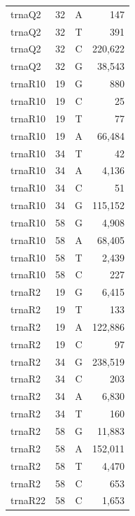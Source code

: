 \documentclass[12pt]{rockefeller}
\begin{document}
\begin{tiny}
\begin{longtable}{|l|r|c|r|}
  trnaQ2 &        32 &          A &        147 \\
  trnaQ2 &        32 &          T &        391 \\
  trnaQ2 &        32 &          C &    220,622 \\
  trnaQ2 &        32 &          G &     38,543 \\
 trnaR10 &        19 &          G &        880 \\
 trnaR10 &        19 &          C &         25 \\
 trnaR10 &        19 &          T &         77 \\
 trnaR10 &        19 &          A &     66,484 \\
 trnaR10 &        34 &          T &         42 \\
 trnaR10 &        34 &          A &      4,136 \\
 trnaR10 &        34 &          C &         51 \\
 trnaR10 &        34 &          G &    115,152 \\
 trnaR10 &        58 &          G &      4,908 \\
 trnaR10 &        58 &          A &     68,405 \\
 trnaR10 &        58 &          T &      2,439 \\
 trnaR10 &        58 &          C &        227 \\
  trnaR2 &        19 &          G &      6,415 \\
  trnaR2 &        19 &          T &        133 \\
  trnaR2 &        19 &          A &    122,886 \\
  trnaR2 &        19 &          C &         97 \\
  trnaR2 &        34 &          G &    238,519 \\
  trnaR2 &        34 &          C &        203 \\
  trnaR2 &        34 &          A &      6,830 \\
  trnaR2 &        34 &          T &        160 \\
  trnaR2 &        58 &          G &     11,883 \\
  trnaR2 &        58 &          A &    152,011 \\
  trnaR2 &        58 &          T &      4,470 \\
  trnaR2 &        58 &          C &        653 \\
 trnaR22 &        58 &          C &      1,653 \\

\end{longtable}
\end{tiny}
\end{document}
